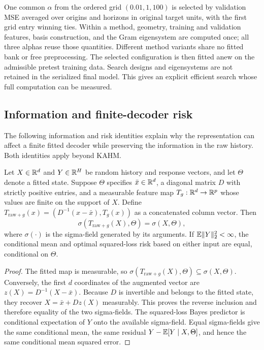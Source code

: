 One common $\alpha$ from the ordered grid $(0.01,1,100)$ is selected by validation MSE averaged
over origins and horizons in original target units, with the first grid
entry winning ties.  Within a method, geometry, training and validation
features, basis construction, and the Gram eigensystem are computed once;
all three alphas reuse those quantities.  Different method variants share
no fitted bank or free preprocessing.  The selected configuration is then
fitted anew on the admissible pretest training data.  Search designs and
eigensystems are not retained in the serialized final model.  This gives
an explicit efficient search whose full computation can be measured.

\subsection{Information and finite-decoder risk}
\label{sec:nf-information}

The following information and risk identities explain why the
representation can affect a finite fitted decoder while preserving the
information in the raw history. Both identities apply beyond KAHM.

\begin{proposition}
\label{prop:nf-raw-preservation}
Let $X\in\mathbb{R}^d$ and $Y\in\mathbb{R}^H$ be random history and response vectors,
and let $\Theta$ denote a fitted state. Suppose $\Theta$ specifies
$\bar x\in\mathbb{R}^d$, a diagonal matrix $D$ with strictly positive entries,
and a measurable feature map $T_g:\mathbb{R}^d\to\mathbb{R}^p$ whose values are finite
on the support of $X$. Define
$T_{\mathrm{raw}+g}(x)=(D^{-1}(x-\bar x),T_g(x))$ as a concatenated
column vector. Then
\[
 \sigma(T_{\mathrm{raw}+g}(X),\Theta)=\sigma(X,\Theta),
\]
where $\sigma(\cdot)$ is the sigma-field generated by its arguments.
If $\mathbb{E}\|Y\|_2^2<\infty$, the conditional mean and optimal squared-loss
risk based on either input are equal, conditional on $\Theta$.
\end{proposition}
\begin{proof}
The fitted map is measurable, so
$\sigma(T_{\mathrm{raw}+g}(X),\Theta)\subseteq\sigma(X,\Theta)$.
Conversely, the first $d$ coordinates of the augmented vector are
$z(X)=D^{-1}(X-\bar x)$. Because $D$ is invertible and belongs to the
fitted state, they recover $X=\bar x+Dz(X)$ measurably. This proves the
reverse inclusion and therefore equality of the two sigma-fields.
The squared-loss Bayes predictor is conditional expectation of $Y$
onto the available sigma-field. Equal sigma-fields give the same
conditional mean, the same residual $Y-\mathbb{E}[Y\mid X,\Theta]$, and hence
the same conditional mean squared error.
\end{proof}

